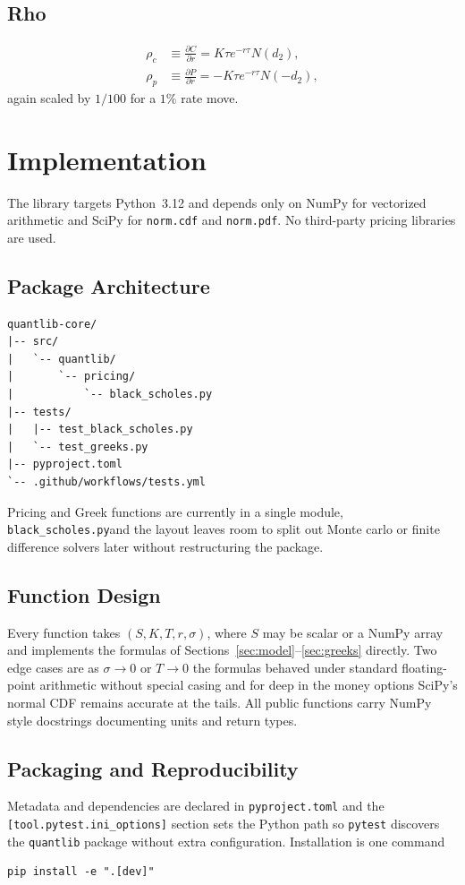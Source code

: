 \documentclass[twocolumn,10pt]{article}
\begin{document}
\subsection{Rho}
\begin{align}
    \rho_c &\equiv \frac{\partial C}{\partial r} = K \tau e^{-r\tau} N(d_2), \label{eq:rho_c}\\
    \rho_p &\equiv \frac{\partial P}{\partial r} = -K \tau e^{-r\tau} N(-d_2), \label{eq:rho_p}
\end{align}
again scaled by $1/100$ for a $1\%$ rate move. 

\section{Implementation}
\label{sec:implementation}

The library targets Python~3.12 and depends only on NumPy  for vectorized arithmetic and SciPy  for \texttt{norm.cdf} and \texttt{norm.pdf}. No third-party pricing libraries are used.

\subsection{Package Architecture}
\begin{verbatim}
quantlib-core/
|-- src/
|   `-- quantlib/
|       `-- pricing/
|           `-- black_scholes.py
|-- tests/
|   |-- test_black_scholes.py
|   `-- test_greeks.py
|-- pyproject.toml
`-- .github/workflows/tests.yml
\end{verbatim}
Pricing and Greek functions are currently in a single module, \texttt{black\_scholes.py}and the layout leaves room to split out Monte carlo or finite difference solvers later without restructuring the package.

\subsection{Function Design}
Every function takes $(S, K, T, r, \sigma)$, where $S$ may be scalar or a NumPy array and implements the formulas of Sections~\ref{sec:model}--\ref{sec:greeks} directly. Two edge cases are as $\sigma \to 0$ or $T \to 0$ the formulas behaved under standard floating-point arithmetic without special casing and for deep in the money options SciPy's normal CDF remains accurate at the tails. All public functions carry NumPy style docstrings documenting units and return types.

\subsection{Packaging and Reproducibility}
Metadata and dependencies are declared in \texttt{pyproject.toml} and the \texttt{[tool.pytest.ini\_options]} section sets the Python path so \texttt{pytest} discovers the \texttt{quantlib} package without extra configuration. Installation is one command
\begin{verbatim}
pip install -e ".[dev]"
\end{verbatim}
\end{document}
